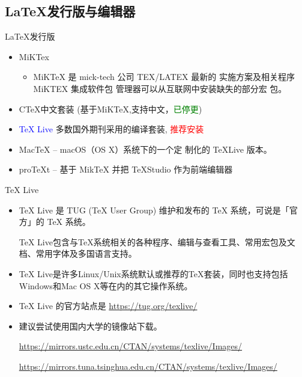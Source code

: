 \documentclass[13pt]{ctexbeamer}
\newcommand{\red}[1]{\textcolor{red}{#1}}
\newcommand{\blue}[1]{\textcolor{blue}{#1}}
\newcommand{\green}[1]{\textcolor{green}{#1}}
\begin{document}
\subsection{LaTeX发行版与编辑器}
\begin{frame}{LaTeX发行版}
\begin{itemize}
	\item MiKTex
		\begin{itemize}
	\item
	MiKTeX 是 mick-tech 公司 TEX/LATEX 最新的
实施方案及相关程序 MiKTEX 集成软件包
管理器可以从互联网中安装缺失的部分宏
包。
\end{itemize}
	\item CTeX中文套装 (基于MiKTeX,支持中文，\green{已停更})

	\item \blue{TeX Live}   多数国外期刊采用的编译套装, \red{推荐安装}


	\item MacTeX -- macOS（OS X）系统下的一个定
制化的 TeXLive 版本。

\item proTeXt -- 基于 MikTeX 并把 TeXStudio 作为前端编辑器
\end{itemize}
\end{frame}


\begin{frame}{TeX Live}
	\begin{itemize}
		\item TeX Live 是 TUG (TeX User Group) 维护和发布的 TeX 系统，可说是「官方」的 TeX 系统。

	TeX Live包含与TeX系统相关的各种程序、编辑与查看工具、常用宏包及文档、常用字体及多国语言支持。
	\item
	TeX Live是许多Linux/Unix系统默认或推荐的TeX套装，同时也支持包括Windows和Mac OS X等在内的其它操作系统。
\end{itemize}
\begin{itemize}

	\item TeX Live 的官方站点是 \href{https://tug.org/texlive/}{https://tug.org/texlive/}
	\item 建议尝试使用国内大学的镜像站下载。

	\href{https://mirrors.ustc.edu.cn/CTAN/systems/texlive/Images/} {https://mirrors.ustc.edu.cn/CTAN/systems/texlive/Images/}


	\href{https://mirrors.tuna.tsinghua.edu.cn/CTAN/systems/texlive/Images/}{https://mirrors.tuna.tsinghua.edu.cn/CTAN/systems/texlive/Images/}

\end{itemize}
\end{frame}
\end{document}
